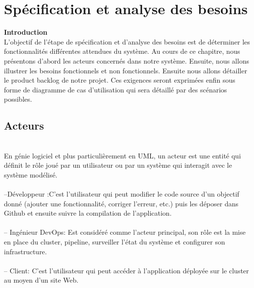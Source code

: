 
\chapter{ Spécification et analyse des besoins}

\textbf{\huge Introduction}\\[0.5cm] 

L'objectif de l'étape de spécification et d'analyse des besoins est de déterminer les fonctionnalités différentes attendues du système. Au cours de ce chapitre, nous présentons d'abord les acteurs concernés dans notre système. Ensuite, nous allons illustrer les besoins fonctionnels et non fonctionnels. Ensuite nous allons détailler le product backlog de notre projet. Ces exigences seront exprimées enfin sous forme de diagramme de cas d'utilisation qui sera détaillé par des scénarios possibles.
\section{\LARGE Acteurs}
\texttt{}\\[0.1cm]
 En génie logiciel et plus particulièrement en UML, un acteur est une entité qui définit le rôle joué par un utilisateur ou par un système qui interagit avec le système modélisé\cite{12}.\\\texttt{}\\[0.01cm]%
 \textsf{\selectfont{}--Développeur :}C'est l'utilisateur qui peut modifier le code source d'un objectif donné (ajouter une fonctionnalité, corriger l'erreur, etc.) puis les déposer dans Github et ensuite suivre la compilation de l'application.\\\texttt{}\\[0.01cm]
\textsf{\selectfont{}-- Ingénieur DevOps:} Est considéré comme l'acteur principal, son rôle est la mise en place du cluster, pipeline, surveiller l'état du système et configurer son infrastructure.\\\texttt{}\\[0.01cm]
\textsf{\selectfont{}-- Client:} C'est l'utilisateur qui peut accéder à l'application déployée sur le cluster au moyen d'un site Web.\\\texttt{}\\[0.01cm]


